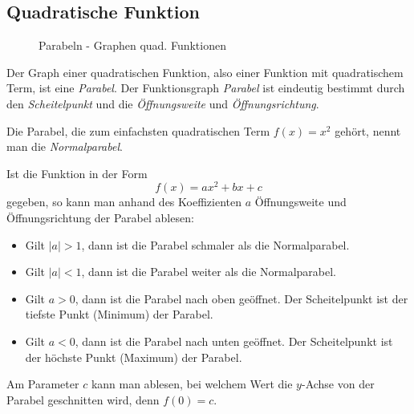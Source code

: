 \subsection{Quadratische Funktion}
\begin{figure}
\centering
{}
\caption{Parabeln - Graphen quad. Funktionen}
\end{figure}

\begin{beme}
Der Graph einer quadratischen Funktion, also einer Funktion mit quadratischem Term, ist eine \emph{Parabel}.
Der Funktionsgraph \emph{Parabel} ist eindeutig bestimmt durch den \emph{Scheitelpunkt} und die \emph{Öffnungsweite} und \emph{Öffnungsrichtung}.

Die Parabel, die zum einfachsten quadratischen Term \(f(x)=x^2\) gehört, nennt man die \emph{Normalparabel}.

Ist die Funktion in der Form
\begin{equation*}
 f(x) = ax^2+bx+c
\end{equation*}
gegeben, so kann man anhand des Koeffizienten \(a\) Öffnungsweite und Öffnungsrichtung der Parabel ablesen:
\begin{itemize}
 \item Gilt \(|a|>1\), dann ist die Parabel schmaler als die Normalparabel.
 \item Gilt \(|a|<1\), dann ist die Parabel weiter als die Normalparabel.
 \item Gilt \(a>0\), dann ist die Parabel nach oben geöffnet. Der Scheitelpunkt ist der tiefste Punkt (Minimum) der Parabel.
 \item Gilt \(a<0\), dann ist die Parabel nach unten geöffnet. Der Scheitelpunkt ist der höchste Punkt (Maximum) der Parabel.
\end{itemize}

Am Parameter \(c\) kann man ablesen, bei welchem Wert die \(y\)-Achse von der Parabel geschnitten wird, denn \(f(0)=c\).

\end{beme}

